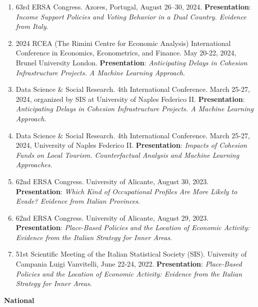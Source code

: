 \documentclass[11pt,a4paper,sans]{moderncv} %
\begin{document}
\begin{enumerate}[label=\arabic*.]
    \item 63rd ERSA Congress. Azores, Portugal, August 26–30, 2024. \textbf{Presentation}: \textit{Income Support Policies and Voting Behavior in a Dual Country. Evidence from Italy}.
    
    \item 2024 RCEA (The Rimini Centre for Economic Analysis) International Conference in Economics, Econometrics, and Finance. May 20-22, 2024, Brunel University London. \textbf{Presentation}: \textit{Anticipating Delays in Cohesion Infrastructure Projects. A Machine Learning Approach}.
    
    \item Data Science \& Social Research. 4th International Conference. March 25-27, 2024, organized by SIS at University of Naples Federico II. \textbf{Presentation}: \textit{Anticipating Delays in Cohesion Infrastructure Projects. A Machine Learning Approach}.
    
    \item Data Science \& Social Research. 4th International Conference. March 25-27, 2024, University of Naples Federico II. \textbf{Presentation}: \textit{Impacts of Cohesion Funds on Local Tourism. Counterfactual Analysis and Machine Learning Approaches}.
    
    \item 62nd ERSA Congress. University of Alicante, August 30, 2023. \textbf{Presentation}: \textit{Which Kind of Occupational Profiles Are More Likely to Evade? Evidence from Italian Provinces}.
    
    \item 62nd ERSA Congress. University of Alicante, August 29, 2023. \textbf{Presentation}: \textit{Place-Based Policies and the Location of Economic Activity: Evidence from the Italian Strategy for Inner Areas}.
    
    \item 51st Scientific Meeting of the Italian Statistical Society (SIS). University of Campania Luigi Vanvitelli, June 22-24, 2022. \textbf{Presentation}: \textit{Place-Based Policies and the Location of Economic Activity: Evidence from the Italian Strategy for Inner Areas}.
    
\end{enumerate}


\textbf{National}
\end{document}
